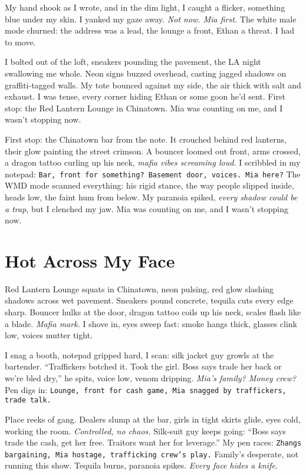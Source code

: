 \documentclass[12pt,oneside]{book} %
\newcommand{\note}[1]{\texttt{#1}}
\begin{document}
My hand shook as I wrote, and in the dim light, I caught a flicker, something blue under my skin. I yanked my gaze away. \textit{Not now. Mia first.} The white male mode churned: the address was a lead, the lounge a front, Ethan a threat. I had to move.

I bolted out of the loft, sneakers pounding the pavement, the LA night swallowing me whole. Neon signs buzzed overhead, casting jagged shadows on graffiti-tagged walls. My tote bounced against my side, the air thick with salt and exhaust. I was tense, every corner hiding Ethan or some goon he’d sent. First stop: the Red Lantern Lounge in Chinatown. Mia was counting on me, and I wasn’t stopping now.

First stop: the Chinatown bar from the note. It crouched behind red lanterns, their glow painting the street crimson. A bouncer loomed out front, arms crossed, a dragon tattoo curling up his neck, \textit{mafia vibes screaming loud.} I scribbled in my notepad: \note{Bar, front for something? Basement door, voices. Mia here?} The WMD mode scanned everything: his rigid stance, the way people slipped inside, heads low, the faint hum from below. My paranoia spiked, \textit{every shadow could be a trap}, but I clenched my jaw. Mia was counting on me, and I wasn’t stopping now.

\chapter{Hot Across My Face}

Red Lantern Lounge squats in Chinatown, neon pulsing, red glow slashing shadows across wet pavement. Sneakers pound concrete, tequila cuts every edge sharp. Bouncer hulks at the door, dragon tattoo coils up his neck, scales flash like a blade. \textit{Mafia mark.} I shove in, eyes sweep fast: smoke hangs thick, glasses clink low, voices mutter tight.

I snag a booth, notepad gripped hard, I scan: silk jacket guy growls at the bartender. “Traffickers botched it. Took the girl. Boss says trade her back or we’re bled dry,” he spits, voice low, venom dripping. \textit{Mia’s family? Money crew?} Pen digs in: \note{Lounge, front for cash game, Mia snagged by traffickers, trade talk.}

Place reeks of gang. Dealers slump at the bar, girls in tight skirts glide, eyes cold, working the room. \textit{Controlled, no chaos.} Silk-suit guy keeps going: “Boss says trade the cash, get her free. Traitors want her for leverage.” My pen races: \note{Zhangs bargaining, Mia hostage, trafficking crew’s play.} Family’s desperate, not running this show. Tequila burns, paranoia spikes. \textit{Every face hides a knife.}
\end{document}
